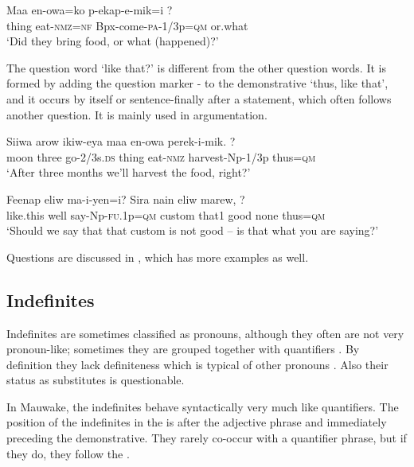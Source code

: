 \ea%
\label{ex:3:x529}
\gll Maa en-owa=ko p-ekap-e-mik=i ? \\
thing eat-\textsc{nmz}=\textsc{nf} Bpx-come-\textsc{pa}-1/3p=\textsc{qm} or.what\\
\glt`Did they bring food, or what (happened)?'
\z

The question word  `like that?' is different from the other question words. It is formed by adding the question marker - to the demonstrative  `thus, like that', and it occurs by itself or sentence-finally after a statement, which often follows another question. It is mainly used in argumentation. 

\ea%
\label{ex:3:x1194}
\gll Siiwa arow ikiw-eya maa en-owa perek-i-mik. ? \\
moon three go-2/3s.\textsc{ds} thing eat-\textsc{nmz} harvest-Np-1/3p thus=\textsc{qm}\\
\glt`After three months we'll harvest the food, right?'
\z

\ea%
\label{ex:3:x1195}
\gll Feenap eliw ma-i-yen=i? Sira nain eliw marew, ?\\
like.this well say-Np-\textsc{fu}.1p=\textsc{qm} custom that1 good none thus=\textsc{qm}\\
\glt`Should we say that that custom is not good -- is that what you are saying?'
\z

Questions are discussed in , which has more examples as well.

\subsection{Indefinites}\label{sec:3.7.2}
{}
Indefinites are sometimes classified as pronouns, although they often are not very pronoun-like; sometimes they are grouped together with quantifiers \citep[81]{HakulinenEtAl1979}%
. By definition they lack definiteness which is typical of other pronouns \citep[376]{QuirkEtAl1989}. Also their status as  substitutes is questionable.

In Mauwake, the indefinites behave syntactically very much like quantifiers. The position of the indefinites in the  is after the adjective phrase and immediately preceding the demonstrative. They rarely co-occur with a quantifier phrase, but if they do, they follow the .


